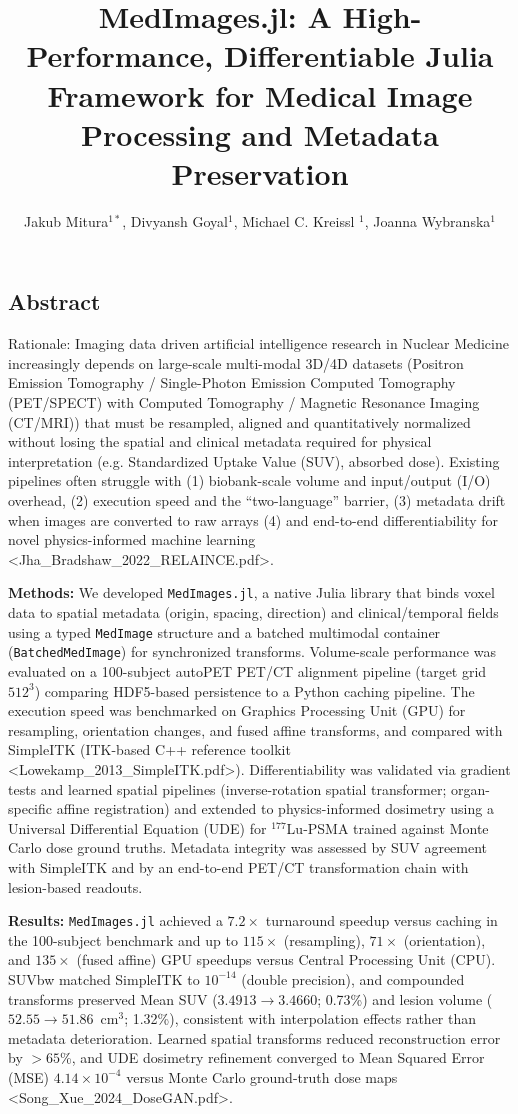 \documentclass[10pt,letterpaper]{article}
\title{MedImages.jl: A High-Performance, Differentiable Julia Framework for Medical Image Processing and Metadata Preservation}
\author{Jakub Mitura$^{1*}$, Divyansh Goyal$^{1}$,  Michael C. Kreissl $^{1}$, Joanna Wybranska$^{1}$}
\date{}
\begin{document}
\subsection*{Abstract}

Rationale: Imaging data driven artificial intelligence research in Nuclear Medicine increasingly depends on large-scale multi-modal 3D/4D datasets (Positron Emission Tomography / Single-Photon Emission Computed Tomography (PET/SPECT) with Computed Tomography / Magnetic Resonance Imaging (CT/MRI)) that must be resampled, aligned and quantitatively normalized without losing the spatial and clinical metadata required for physical interpretation (e.g. Standardized Uptake Value (SUV), absorbed dose). Existing pipelines often struggle with (1) biobank-scale volume and input/output (I/O) overhead, (2) execution speed and the ``two-language'' barrier, (3) metadata drift when images are converted to raw arrays (4) and end-to-end differentiability for novel physics-informed machine learning <Jha_Bradshaw_2022_RELAINCE.pdf>.

\textbf{Methods:} We developed \texttt{MedImages.jl}, a native Julia library that binds voxel data to spatial metadata (origin, spacing, direction) and clinical/temporal fields using a typed \texttt{MedImage} structure and a batched multimodal container (\texttt{BatchedMedImage}) for synchronized transforms. Volume-scale performance was evaluated on a 100-subject autoPET PET/CT alignment pipeline (target grid $512^3$) comparing HDF5-based persistence to a Python caching pipeline. The execution speed was benchmarked on Graphics Processing Unit (GPU) for resampling, orientation changes, and fused affine transforms, and compared with SimpleITK (ITK-based C++ reference toolkit <Lowekamp_2013_SimpleITK.pdf>). Differentiability was validated via gradient tests and learned spatial pipelines (inverse-rotation spatial transformer; organ-specific affine registration) and extended to physics-informed dosimetry using a Universal Differential Equation (UDE) for $^{177}$Lu-PSMA trained against Monte Carlo dose ground truths. Metadata integrity was assessed by SUV agreement with SimpleITK and by an end-to-end PET/CT transformation chain with lesion-based readouts.

\textbf{Results:} \texttt{MedImages.jl} achieved a $7.2\times$ turnaround speedup versus caching in the 100-subject benchmark and up to $115\times$ (resampling), $71\times$ (orientation), and $135\times$ (fused affine) GPU speedups versus Central Processing Unit (CPU). SUVbw matched SimpleITK to $10^{-14}$ (double precision), and compounded transforms preserved Mean SUV ($3.4913 \rightarrow 3.4660$; 0.73\%) and lesion volume ($52.55 \rightarrow 51.86$~cm$^3$; 1.32\%), consistent with interpolation effects rather than metadata deterioration. Learned spatial transforms reduced reconstruction error by $>65$\%, and UDE dosimetry refinement converged to Mean Squared Error (MSE) $4.14\times10^{-4}$ versus Monte Carlo ground-truth dose maps <Song_Xue_2024_DoseGAN.pdf>.
\end{document}
